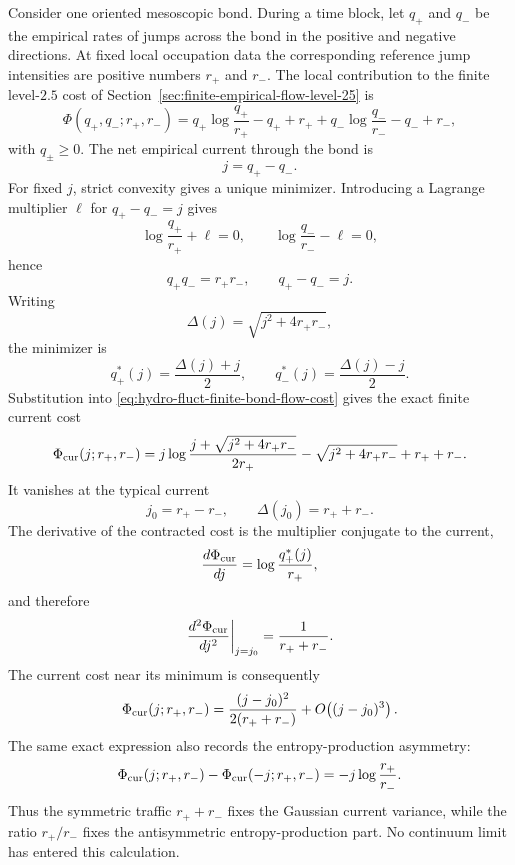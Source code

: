 Consider one oriented mesoscopic bond.  During a time block, let \(q_+\) and
\(q_-\) be the empirical rates of jumps across the bond in the positive and
negative directions.  At fixed local occupation data the corresponding
reference jump intensities are positive numbers \(r_+\) and \(r_-\).  The
local contribution to the finite level-\(2.5\) cost of
Section~\ref{sec:finite-empirical-flow-level-25} is
\begin{equation}
  \Phi(q_+,q_-;r_+,r_-)
  =
  q_+\log\frac{q_+}{r_+}-q_++r_+
  +
  q_-\log\frac{q_-}{r_-}-q_-+r_- ,
  \label{eq:hydro-fluct-finite-bond-flow-cost}
\end{equation}
with \(q_\pm\ge0\).  The net empirical current through the bond is
\[
  j=q_+-q_- .
\]
For fixed \(j\), strict convexity gives a unique minimizer.  Introducing a
Lagrange multiplier \(\ell\) for \(q_+-q_-=j\) gives
\[
  \log\frac{q_+}{r_+}+\ell=0,
  \qquad
  \log\frac{q_-}{r_-}-\ell=0,
\]
hence
\[
  q_+q_-=r_+r_-,
  \qquad
  q_+-q_-=j .
\]
Writing
\[
  \Delta(j)=\sqrt{j^2+4r_+r_-},
\]
the minimizer is
\begin{equation}
  q_+^*(j)=\frac{\Delta(j)+j}{2},
  \qquad
  q_-^*(j)=\frac{\Delta(j)-j}{2}.
  \label{eq:hydro-fluct-bond-current-minimizer}
\end{equation}
Substitution into \eqref{eq:hydro-fluct-finite-bond-flow-cost} gives the
exact finite current cost
\begin{equation}
  \Phi_{\rm cur}(j;r_+,r_-)
  =
  j\log
  \frac{j+\sqrt{j^2+4r_+r_-}}{2r_+}
  -
  \sqrt{j^2+4r_+r_-}
  +r_++r_- .
  \label{eq:hydro-fluct-finite-bond-current-cost}
\end{equation}
It vanishes at the typical current
\[
  j_0=r_+-r_-,
  \qquad
  \Delta(j_0)=r_++r_- .
\]
The derivative of the contracted cost is the multiplier conjugate to the
current,
\[
  \frac{d\Phi_{\rm cur}}{dj}
  =
  \log\frac{q_+^*(j)}{r_+},
\]
and therefore
\[
  \left.
  \frac{d^2\Phi_{\rm cur}}{dj^2}
  \right|_{j=j_0}
  =
  \frac{1}{r_++r_-}.
\]
The current cost near its minimum is consequently
\begin{equation}
  \Phi_{\rm cur}(j;r_+,r_-)
  =
  \frac{(j-j_0)^2}{2(r_++r_-)}
  +O\!\left((j-j_0)^3\right).
  \label{eq:hydro-fluct-current-cost-quadratic-expansion}
\end{equation}
The same exact expression also records the entropy-production asymmetry:
\begin{equation}
  \Phi_{\rm cur}(j;r_+,r_-)
  -
  \Phi_{\rm cur}(-j;r_+,r_-)
  =
  -j\log\frac{r_+}{r_-}.
  \label{eq:hydro-fluct-bond-current-gc-asymmetry}
\end{equation}
Thus the symmetric traffic \(r_++r_-\) fixes the Gaussian current variance,
while the ratio \(r_+/r_-\) fixes the antisymmetric entropy-production
part.  No continuum limit has entered this calculation.

